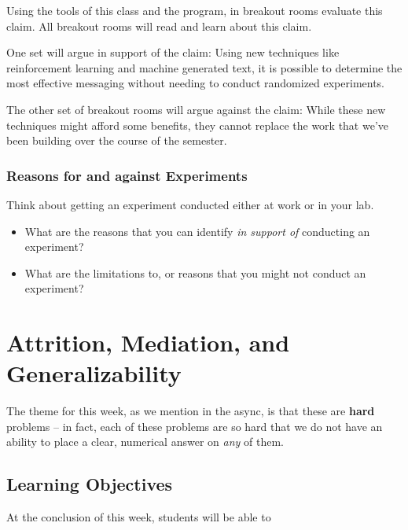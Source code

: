\documentclass[
]{article}
\providecommand{\tightlist}{%
  \setlength{\itemsep}{0pt}\setlength{\parskip}{0pt}}
\theoremstyle{definition}
\theoremstyle{definition}
\theoremstyle{definition}
\theoremstyle{definition}
\theoremstyle{remark}
\begin{document}
Using the tools of this class and the program, in breakout rooms evaluate this claim. All breakout rooms will read and learn about this claim.

One set will argue in support of the claim: Using new techniques like reinforcement learning and machine generated text, it is possible to determine the most effective messaging without needing to conduct randomized experiments.

The other set of breakout rooms will argue against the claim: While these new techniques might afford some benefits, they cannot replace the work that we've been building over the course of the semester.

\subsubsection{Reasons for and against Experiments}\label{reasons-for-and-against-experiments}

Think about getting an experiment conducted either at work or in your lab.

\begin{itemize}
\tightlist
\item
  What are the reasons that you can identify \emph{in support of} conducting an experiment?
\item
  What are the limitations to, or reasons that you might not conduct an experiment?
\end{itemize}

\section{Attrition, Mediation, and Generalizability}\label{attrition-mediation-and-generalizability}

The theme for this week, as we mention in the async, is that these are \textbf{hard} problems -- in fact, each of these problems are so hard that we do not have an ability to place a clear, numerical answer on \emph{any} of them.

\subsection{Learning Objectives}\label{learning-objectives-12}

At the conclusion of this week, students will be able to
\end{document}

